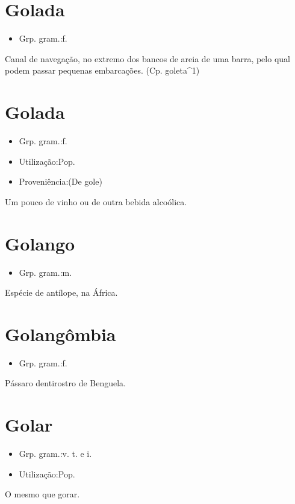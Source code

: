 \section{Golada}
\begin{itemize}
\item {Grp. gram.:f.}
\end{itemize}
Canal de navegação, no extremo dos bancos de areia de uma barra, pelo qual podem passar pequenas embarcações.
(Cp. \textunderscore goleta\textunderscore ^1)
\section{Golada}
\begin{itemize}
\item {Grp. gram.:f.}
\end{itemize}
\begin{itemize}
\item {Utilização:Pop.}
\end{itemize}
\begin{itemize}
\item {Proveniência:(De \textunderscore gole\textunderscore )}
\end{itemize}
Um pouco de vinho ou de outra bebida alcoólica.
\section{Golango}
\begin{itemize}
\item {Grp. gram.:m.}
\end{itemize}
Espécie de antílope, na África.
\section{Golangômbia}
\begin{itemize}
\item {Grp. gram.:f.}
\end{itemize}
Pássaro dentirostro de Benguela.
\section{Golar}
\begin{itemize}
\item {Grp. gram.:v. t.  e  i.}
\end{itemize}
\begin{itemize}
\item {Utilização:Pop.}
\end{itemize}
O mesmo que \textunderscore gorar\textunderscore .
